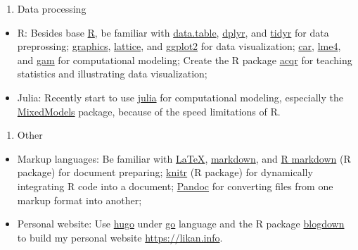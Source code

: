 \documentclass[12pt,]{article}
\providecommand{\tightlist}{%
  \setlength{\itemsep}{0pt}\setlength{\parskip}{0pt}}
\begin{document}
\begin{enumerate}
\def\labelenumi{\arabic{enumi}.}
\setcounter{enumi}{1}
\tightlist
\item
  Data processing
\end{enumerate}

\begin{itemize}
\tightlist
\item
  R: Besides base \href{https://www.r-project.org}{R}, be familiar with
  \href{http://r-datatable.com}{data.table},
  \href{https://cran.r-project.org/web/packages/dplyr/index.html}{dplyr},
  and
  \href{https://cran.r-project.org/web/packages/tidyr/index.html}{tidyr}
  for data preprossing;
  \href{https://stat.ethz.ch/R-manual/R-devel/library/graphics/html/00Index.html}{graphics},
  \href{https://cran.r-project.org/package=lattice}{lattice}, and
  \href{http://ggplot2.tidyverse.org}{ggplot2} for data visualization;
  \href{https://cran.r-project.org/web/packages/car/index.html}{car},
  \href{https://github.com/lme4/lme4}{lme4}, and
  \href{https://cran.r-project.org/web/packages/gam/index.html}{gam} for
  computational modeling; Create the R package
  \href{https://github.com/likanzhan/acqr}{acqr} for teaching statistics
  and illustrating data visualization;
\item
  Julia: Recently start to use \href{https://julialang.org}{julia} for
  computational modeling, especially the
  \href{https://github.com/dmbates/MixedModels.jl}{MixedModels} package,
  because of the speed limitations of R.
\end{itemize}

\begin{enumerate}
\def\labelenumi{\arabic{enumi}.}
\setcounter{enumi}{2}
\tightlist
\item
  Other
\end{enumerate}

\begin{itemize}
\tightlist
\item
  Markup languages: Be familiar with
  \href{https://www.latex-project.org}{LaTeX},
  \href{https://daringfireball.net/projects/markdown/}{markdown}, and
  \href{https://rmarkdown.rstudio.com}{R markdown} (R package) for
  document preparing;
  \href{https://cran.r-project.org/web/packages/knitr/index.html}{knitr}
  (R package) for dynamically integrating R code into a document;
  \href{https://pandoc.org}{Pandoc} for converting files from one markup
  format into another;
\item
  Personal website: Use \href{https://gohugo.io}{hugo} under
  \href{https://golang.org}{go} language and the R package
  \href{https://github.com/rstudio/blogdown}{blogdown} to build my
  personal website \url{https://likan.info}.
\end{itemize}
\end{document}
